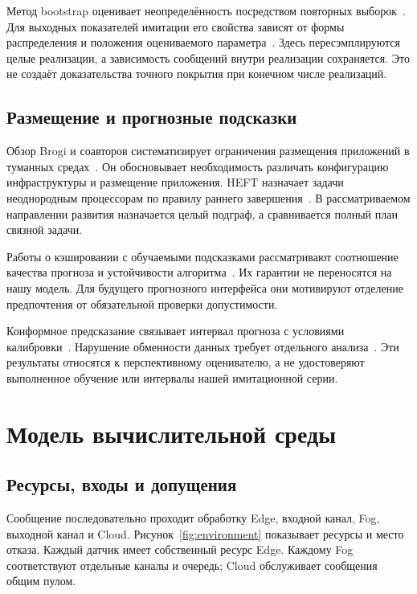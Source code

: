 \documentclass{psta}
\begin{document}
Метод bootstrap оценивает неопределённость посредством повторных выборок~\cite{efron}. Для выходных показателей имитации его свойства зависят от формы распределения и положения оцениваемого параметра~\cite{barton}. Здесь пересэмплируются целые реализации, а зависимость сообщений внутри реализации сохраняется. Это не создаёт доказательства точного покрытия при конечном числе реализаций.

\subsection{Размещение и прогнозные подсказки}
Обзор Brogi и соавторов систематизирует ограничения размещения приложений в туманных средах~\cite{fogsurvey}. Он обосновывает необходимость различать конфигурацию инфраструктуры и размещение приложения. HEFT назначает задачи неоднородным процессорам по правилу раннего завершения~\cite{heft}. В рассматриваемом направлении развития назначается целый подграф, а сравнивается полный план связной задачи.

Работы о кэшировании с обучаемыми подсказками рассматривают соотношение качества прогноза и устойчивости алгоритма~\cite{lykouris18,lykouris21,advice}. Их гарантии не переносятся на нашу модель. Для будущего прогнозного интерфейса они мотивируют отделение предпочтения от обязательной проверки допустимости.

Конформное предсказание связывает интервал прогноза с условиями калибровки~\cite{angelopoulos}. Нарушение обменности данных требует отдельного анализа~\cite{barber}. Эти результаты относятся к перспективному оценивателю, а не удостоверяют выполненное обучение или интервалы нашей имитационной серии.

\section{Модель вычислительной среды}\label{sec:model}
\subsection{Ресурсы, входы и допущения}
Сообщение последовательно проходит обработку Edge, входной канал, Fog, выходной канал и Cloud. Рисунок~\ref{fig:environment} показывает ресурсы и место отказа. Каждый датчик имеет собственный ресурс Edge. Каждому Fog соответствуют отдельные каналы и очередь; Cloud обслуживает сообщения общим пулом.
\end{document}
